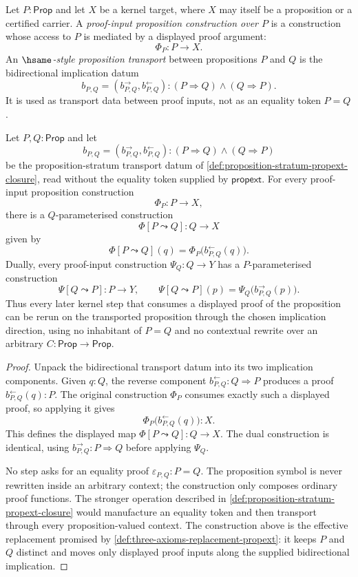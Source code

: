 \begin{definition}
\label{def:proof-input-proposition-construction}
Let $P:\mathsf{Prop}$ and let $X$ be a kernel target, where $X$ may itself be a proposition or a certified carrier. A \emph{proof-input proposition construction over $P$} is a construction whose access to $P$ is mediated by a displayed proof argument:
$$
\Phi_P:P\to X.
$$
An \emph{$\hsame$-style proposition transport} between propositions $P$ and $Q$ is the bidirectional implication datum
$$
b_{P,Q}=(b^\rightarrow_{P,Q},b^\leftarrow_{P,Q}):(P\Rightarrow Q)\land(Q\Rightarrow P).
$$
It is used as transport data between proof inputs, not as an equality token $P=Q$.
\end{definition}

\begin{theorem}
\label{thm:hsame-proposition-transport-bypasses-propext}
Let $P,Q:\mathsf{Prop}$ and let
$$
b_{P,Q}=(b^\rightarrow_{P,Q},b^\leftarrow_{P,Q}):(P\Rightarrow Q)\land(Q\Rightarrow P)
$$
be the proposition-stratum transport datum of \autoref{def:proposition-stratum-propext-closure}, read without the equality token supplied by $\mathsf{propext}$. For every proof-input proposition construction
$$
\Phi_P:P\to X,
$$
there is a $Q$-parameterised construction
$$
\Phi[P\leadsto Q]:Q\to X
$$
given by
$$
\Phi[P\leadsto Q](q)=\Phi_P\bigl(b^\leftarrow_{P,Q}(q)\bigr).
$$
Dually, every proof-input construction $\Psi_Q:Q\to Y$ has a $P$-parameterised construction
$$
\Psi[Q\leadsto P]:P\to Y,
\qquad
\Psi[Q\leadsto P](p)=\Psi_Q\bigl(b^\rightarrow_{P,Q}(p)\bigr).
$$
Thus every later kernel step that consumes a displayed proof of the proposition can be rerun on the transported proposition through the chosen implication direction, using no inhabitant of $P=Q$ and no contextual rewrite over an arbitrary $C:\mathsf{Prop}\to\mathsf{Prop}$.
\end{theorem}
\begin{proof}
Unpack the bidirectional transport datum into its two implication components. Given $q:Q$, the reverse component $b^\leftarrow_{P,Q}:Q\Rightarrow P$ produces a proof $b^\leftarrow_{P,Q}(q):P$. The original construction $\Phi_P$ consumes exactly such a displayed proof, so applying it gives
$$
\Phi_P\bigl(b^\leftarrow_{P,Q}(q)\bigr):X.
$$
This defines the displayed map $\Phi[P\leadsto Q]:Q\to X$. The dual construction is identical, using $b^\rightarrow_{P,Q}:P\Rightarrow Q$ before applying $\Psi_Q$.

No step asks for an equality proof $\varepsilon_{P,Q}:P=Q$. The proposition symbol is never rewritten inside an arbitrary context; the construction only composes ordinary proof functions. The stronger operation described in \autoref{def:proposition-stratum-propext-closure} would manufacture an equality token and then transport through every proposition-valued context. The construction above is the effective replacement promised by \autoref{def:three-axioms-replacement-propext}: it keeps $P$ and $Q$ distinct and moves only displayed proof inputs along the supplied bidirectional implication.
\end{proof}


